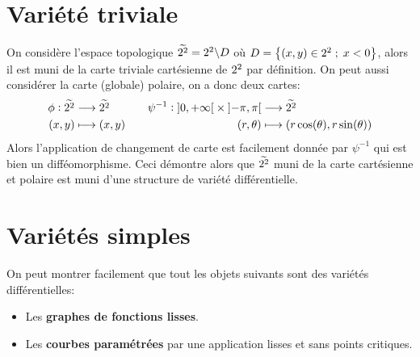    \section{Variété triviale}
   On considère l'espace topologique \( \widetilde{2^2} = 2^2 \backslash D\) où \(D = \left\{ (x, y) \in 2^2 \; ; \; x < 0 \right\}\), alors il est muni de la carte triviale cartésienne de \( 2^2 \) par définition. On peut aussi considérer la carte (globale) polaire, on a donc deux cartes:
   \[ 
      \begin{aligned}
         \phi : \widetilde{\R^2} &\longrightarrow \widetilde{\R^2} \\
         (x, y) &\longmapsto (x, y)
      \end{aligned} \quad\quad
      \begin{aligned}
         \psi^{-1} : \ioo{0}{+\infty} \times \ioo{-\pi}{\pi} &\longrightarrow \widetilde{\R^2} \\
         (r, \theta) &\longmapsto (r \cos( \theta), r \sin( \theta))
      \end{aligned}
   \]
   Alors l'application de changement de carte est facilement donnée par \( \psi^{-1} \) qui est bien un difféomorphisme. Ceci démontre alors que \( \widetilde{2^2} \) muni de la carte cartésienne et polaire est muni d'une structure de variété différentielle.
   
   \section{Variétés simples}
   On peut montrer facilement que tout les objets suivants sont des variétés différentielles:
   \begin{itemize}
      \item Les \textbf{graphes de fonctions lisses}.
      \item Les \textbf{courbes paramétrées} par une application lisses et sans points critiques.
   \end{itemize}
